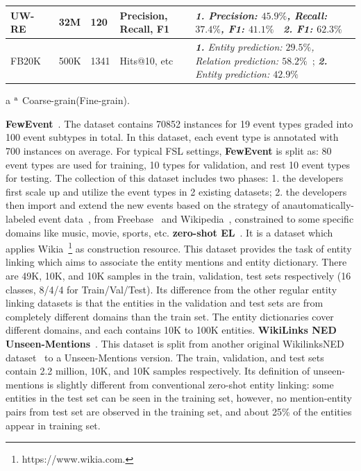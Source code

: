 \begin{table}[t]
\begin{tabular}{p{75pt}|p{25pt}|p{25pt}|p{70pt}|p{150pt}}
\hline
UW-RE~ & 32M & 120 & Precision, Recall, F1 & \tabincell{l}{\textit{\textbf{1.} Precision: $45.9\%$, Recall: $37.4\%$, F1: $41.1\%$}~ \\ \textit{\textbf{2.} F1: $62.3\%$}~} \\
\hline
FB20K~ & 500K & 1341 & Hits@10, etc & \textit{\textbf{1.} Entity prediction: $29.5\%$, Relation prediction: $58.2\%$}~; \textit{\textbf{2.} Entity prediction: $42.9\%$}~ \\
\hline
\end{tabular}
\begin{tablenotes}
\footnotesize
\item[a]${\rm ^a}$ Coarse-grain(Fine-grain).
\end{tablenotes}
\end{table}
\textbf{FewEvent}~. The dataset contains 70852 instances for 19 event types graded into 100 event subtypes in total. In this dataset, each event type is annotated with 700 instances on average. For typical FSL settings, \textbf{FewEvent} is split as: 80 event types are used for training, 10 types for validation, and rest 10 event types for testing. The collection of this dataset includes two phases: 1. the developers first scale up and utilize the event types in 2 existing datasets; 2. the developers then import and extend the new events based on the strategy of anautomatically-labeled event data~, from Freebase~ and Wikipedia~, constrained to some specific domains like music, movie, sports, etc.
\textbf{zero-shot EL}~. It is a dataset which applies Wikia~\footnote{https://www.wikia.com.} as construction resource. This dataset provides the task of entity linking which aims to associate the entity mentions and entity dictionary. There are 49K, 10K, and 10K samples in the train, validation, test sets respectively (16 classes, 8/4/4 for Train/Val/Test). Its difference from the other regular entity linking datasets is that the entities in the validation and test sets are from completely different domains than the train set. The entity dictionaries cover different domains, and each contains 10K to 100K entities.
\textbf{WikiLinks NED Unseen-Mentions}~. This dataset is split from another original WikilinksNED dataset~ to a Unseen-Mentions version. The train, validation, and test sets contain 2.2 million, 10K, and 10K samples respectively. Its definition of unseen-mentions is slightly different from conventional zero-shot entity linking: some entities in the test set can be seen in the training set, however, no mention-entity pairs from test set are observed in the training set, and about 25\% of the entities appear in training set.
